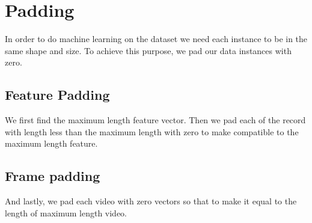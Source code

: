 \section{ Padding}
In order to do machine learning on the dataset we need each instance to be in the same shape and size. To achieve this purpose, we pad our data instances with zero.
\subsection{ Feature Padding }
We first find the maximum length feature vector. Then we pad each of the record with length less than the maximum length with zero to make compatible to the maximum length feature.
\subsection{ Frame padding}
And lastly, we pad each video with zero vectors so that to make it equal to the length of maximum length video.
